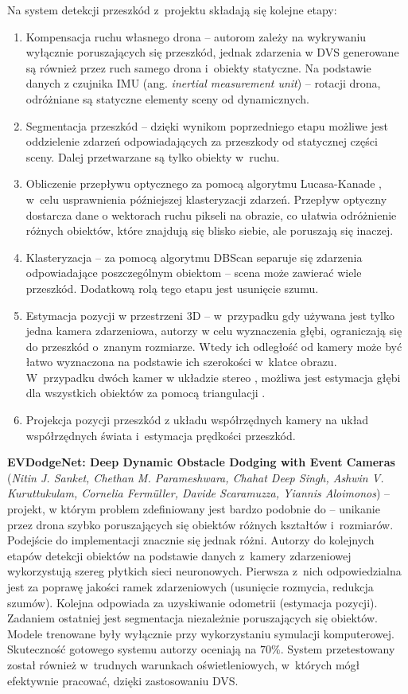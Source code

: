 Na system detekcji przeszkód z~projektu \cite{dynamic_obstacle} składają się kolejne etapy:
\begin{enumerate}
    \item Kompensacja ruchu własnego drona -- autorom zależy na wykrywaniu wyłącznie poruszających się przeszkód, jednak zdarzenia w DVS generowane są również przez ruch  samego drona i~obiekty statyczne. Na podstawie danych z czujnika IMU (ang. \textit{inertial measurement unit}) -- rotacji drona, odróżniane są statyczne elementy sceny od dynamicznych.
    \item Segmentacja przeszkód -- dzięki wynikom poprzedniego etapu możliwe jest oddzielenie zdarzeń odpowiadających za przeszkody od statycznej części sceny. Dalej przetwarzane są tylko obiekty w~ruchu.
    \item Obliczenie przepływu optycznego za pomocą algorytmu Lucasa-Kanade \cite{Lucas-Kanade}, w~celu usprawnienia późniejszej klasteryzacji zdarzeń. Przepływ optyczny dostarcza dane o wektorach ruchu pikseli na obrazie, co ułatwia odróżnienie różnych obiektów, które znajdują się blisko siebie, ale poruszają się inaczej.
    \item Klasteryzacja -- za pomocą algorytmu DBScan \cite{DBScan} separuje się zdarzenia odpowiadające poszczególnym obiektom -- scena może zawierać wiele przeszkód. Dodatkową rolą tego etapu jest usunięcie szumu.
    \item Estymacja pozycji w przestrzeni 3D -- w~przypadku gdy używana jest tylko jedna kamera zdarzeniowa, autorzy w celu wyznaczenia głębi, ograniczają się do przeszkód o~znanym rozmiarze. Wtedy ich odległość od kamery może być łatwo wyznaczona na podstawie ich szerokości w~klatce obrazu.
    W~przypadku dwóch kamer w układzie stereo \cite{detection_methods}, możliwa jest estymacja głębi dla wszystkich obiektów za pomocą triangulacji \cite{view_geometry}.
    \item Projekcja pozycji przeszkód z układu współrzędnych kamery na układ współrzędnych świata i~estymacja prędkości przeszkód.

\end{enumerate}

\textbf{EVDodgeNet: Deep Dynamic Obstacle Dodging with Event Cameras} (\textit{Nitin J. Sanket, Chethan M. Parameshwara, Chahat Deep Singh, Ashwin V. Kuruttukulam,
Cornelia Fermüller, Davide Scaramuzza, Yiannis Aloimonos}) \cite{EVDodge} -- projekt, w którym problem zdefiniowany jest bardzo podobnie do \cite{dynamic_obstacle} -- unikanie przez drona szybko poruszających się obiektów różnych kształtów i~rozmiarów. Podejście do implementacji znacznie się jednak różni. Autorzy do kolejnych etapów detekcji obiektów na podstawie danych z~kamery zdarzeniowej wykorzystują szereg płytkich sieci neuronowych. Pierwsza z~nich odpowiedzialna jest za poprawę jakości ramek zdarzeniowych (usunięcie rozmycia, redukcja szumów). Kolejna odpowiada za uzyskiwanie odometrii (estymacja pozycji). Zadaniem ostatniej jest segmentacja niezależnie poruszających się obiektów. Modele trenowane były wyłącznie przy wykorzystaniu symulacji komputerowej. Skuteczność gotowego systemu autorzy oceniają na $70\%$. System przetestowany został również w~trudnych warunkach oświetleniowych, w~których mógł efektywnie pracować, dzięki zastosowaniu DVS. 

